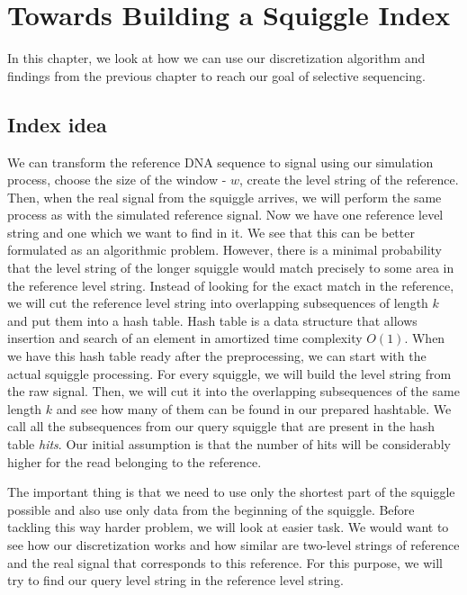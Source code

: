 \chapter{Towards Building a Squiggle Index}

\label{kap:methAdjust} %

In this chapter, we look at how we can use our discretization algorithm and findings
from the previous chapter to reach our goal of selective sequencing.

\section{Index idea}

We can transform the reference DNA sequence to signal using our simulation
process, choose the size of the window - $w$, create the level string of the reference.
Then, when the real signal from the squiggle arrives, we will perform the same process
as with the simulated reference signal. Now we have one reference level string and
one which we want to find in it. We see that this can be better formulated as an
algorithmic problem. However, there is a minimal probability that the level string
of the longer squiggle would match precisely to some area in the reference level string.
Instead of looking for the exact match in the reference, we will cut the reference
level string into overlapping subsequences of length $k$ and put them into a hash table.
Hash table is a data structure that allows insertion and search of an element in
amortized time complexity $O(1)$. When we have this hash table ready after the
preprocessing, we can start with the actual squiggle processing. For every squiggle, we will
build the level string from the raw signal. Then, we will cut it into the overlapping
subsequences of the same length $k$ and see how many of them can be found in our
prepared hashtable. We call all the subsequences from our query squiggle that are
present in the hash table \textit{hits}. Our initial assumption is that the number
of hits will be considerably higher for the read belonging to the reference.

The important thing is that we need to use only the shortest part of the squiggle
possible and also use only data from the beginning of the squiggle. Before tackling
this way harder problem, we will look at easier task. We would want to see how
our discretization works and how similar are two-level strings of reference and
the real signal that corresponds to this reference. For this purpose, we will try to
find our query level string in the reference level string.


